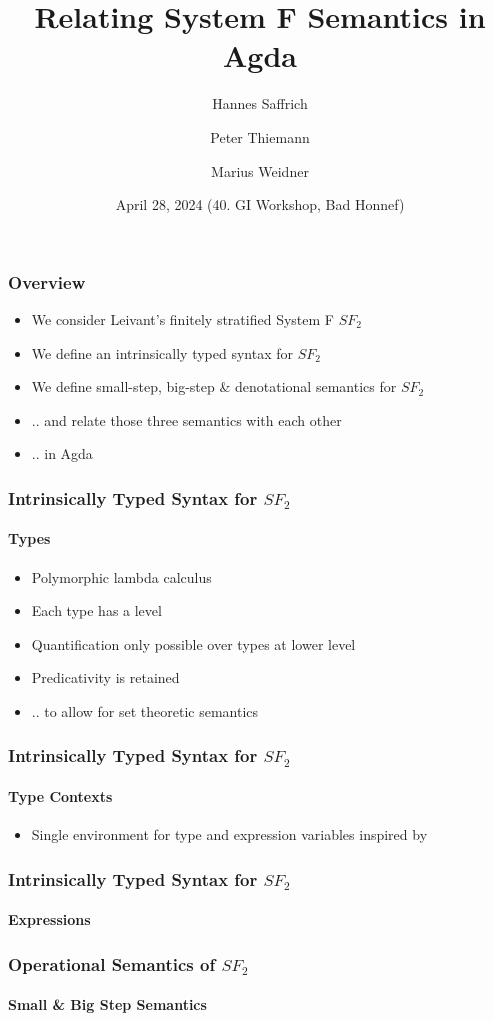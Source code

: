 \documentclass[dvipsnames,aspectratio=169,pdftex]{beamer}
\title{Relating System F Semantics in Agda}
\author[Saffrich, Thiemann, Weidner] {
  Hannes Saffrich \and 
  Peter Thiemann \and
  Marius Weidner
}
\institute{University of Freiburg}
\date{April 28, 2024 (40. GI Workshop, Bad Honnef)}
\begin{document}
\begin{frame}{\null}
  \titlepage 
\end{frame}

\begin{frame}[fragile]
  \frametitle{Overview}
  \begin{itemize}
    \item We consider Leivant's finitely stratified System F $SF_2$ \cite{DBLP:journals/iandc/Leivant91}
    \item We define an intrinsically typed syntax for $SF_2$
    \item We define small-step, big-step \& denotational semantics for $SF_2$
    \item .. and relate those three semantics with each other
    \item .. in Agda
  \end{itemize}
\end{frame}

\begin{frame}
  \frametitle{Intrinsically Typed Syntax for $SF_2$}
  \framesubtitle{Types}
  \TFLEnv
  \TFType
  \begin{itemize}
    \item Polymorphic lambda calculus \cite{girard72:_inter,DBLP:conf/programm/Reynolds74}
    \item Each type has a level
    \item Quantification only possible over types at lower level
    \item Predicativity is retained
    \item .. to allow for set theoretic semantics
  \end{itemize}
\end{frame}

\begin{frame}
  \frametitle{Intrinsically Typed Syntax for $SF_2$}
  \framesubtitle{Type Contexts}
  \TFTVEnv
  \TFinn
  \begin{itemize}
    \item Single environment for type and expression variables inspired by \cite{DBLP:conf/mpc/ChapmanKNW19}
  \end{itemize}
\end{frame}

\begin{frame}
  \frametitle{Intrinsically Typed Syntax for $SF_2$}
  \framesubtitle{Expressions}
  \TFExprExcerpt
\end{frame}

\begin{frame}
  \frametitle{Operational Semantics of $SF_2$}
  \framesubtitle{Small \& Big Step Semantics}
  \SingleReductionExcerpt
  \SemanticsExcerpt
\end{frame}
\end{document}

